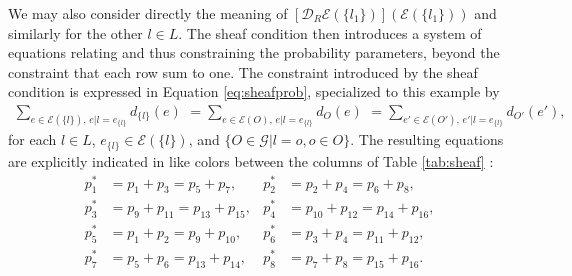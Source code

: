 We may also consider directly the meaning of $\left[\mathcal{D}_R\mathcal{E}(\{l_1\})\right](\mathcal{E}(\{l_1\}))$ and similarly for the other $l \in L$. The sheaf condition then introduces a system of equations relating and thus constraining the probability parameters, beyond the constraint that each row sum to one. The constraint introduced by the sheaf condition is expressed in Equation \ref{eq:sheafprob}, specialized to this example by
\begin{eqnarray}\label{eq:sheafprob2}
\sum_{e \in \mathcal{E}(\{l\}),\, e|l=e_{\{l\}}} d_{\{l\}}(e) \,\, = \sum_{e \in \mathcal{E}(O),\, e|l=e_{\{l\}}} d_O(e) \,\, = \sum_{e' \in \mathcal{E}(O'),\, e'|l=e_{\{l\}}} d_{O'}(e'),
\end{eqnarray}
for each $l \in L$, $e_{\{l\}} \in \mathcal{E}(\{l\})$, and $\{O \in \mathcal{G}|l=o, o \in O\}$. The resulting equations are explicitly indicated in like colors between the columns of Table \ref{tab:sheaf} :
\begin{equation}
\begin{aligned}\label{eq:pparsys}
p^*_1 &= p_1 + p_3 = p_5 + p_7, &
p^*_2 &= p_2 + p_4 = p_6 + p_8,\\
p^*_3 &= p_9 + p_{11} = p_{13} + p_{15},&
p^*_4 &= p_{10} + p_{12} = p_{14} + p_{16},\\
p^*_5 &= p_1 + p_2 = p_9 + p_{10},&
p^*_6 &= p_3 + p_4 = p_{11} + p_{12},\\
p^*_7 &= p_5 + p_6 = p_{13} + p_{14},&
p^*_8 &= p_7 + p_8 = p_{15} + p_{16}.
\end{aligned}
\end{equation}

